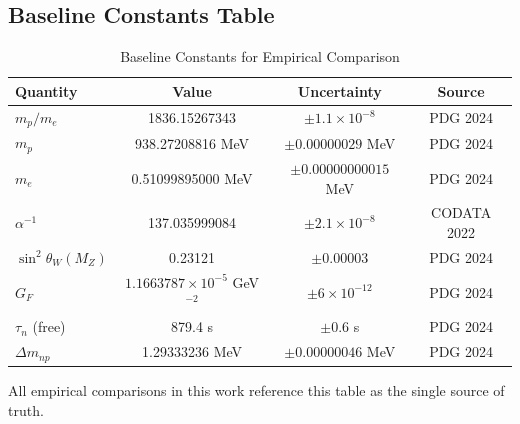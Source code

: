 
\subsection*{Baseline Constants Table}
\label{subsec:baseline_constants}

\begin{table}[h]
\caption{Baseline Constants for Empirical Comparison}
\label{tab:baseline_constants}
\centering
\begin{tabular}{lccc}
\hline
\textbf{Quantity} & \textbf{Value} & \textbf{Uncertainty} & \textbf{Source} \\
\hline
$m_p/m_e$ & 1836.15267343 & $\pm 1.1 \times 10^{-8}$ & PDG 2024 \\
$m_p$ & 938.27208816 MeV & $\pm 0.00000029$ MeV & PDG 2024 \\
$m_e$ & 0.51099895000 MeV & $\pm 0.00000000015$ MeV & PDG 2024 \\
$\alpha^{-1}$ & 137.035999084 & $\pm 2.1 \times 10^{-8}$ & CODATA 2022 \\
$\sin^2\theta_W(M_Z)$ & 0.23121 & $\pm 0.00003$ & PDG 2024 \\
$G_F$ & $1.1663787 \times 10^{-5}$ GeV$^{-2}$ & $\pm 6 \times 10^{-12}$ & PDG 2024 \\
$\tau_n$ (free) & 879.4 s & $\pm 0.6$ s & PDG 2024 \\
$\Delta m_{np}$ & 1.29333236 MeV & $\pm 0.00000046$ MeV & PDG 2024 \\
\hline
\end{tabular}
\end{table}

All empirical comparisons in this work reference this table as the single source of truth.

